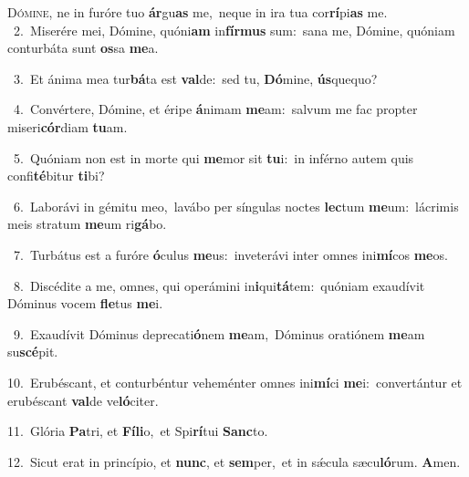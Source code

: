 \lettrine{\initial\textcolor{\initialcolor}{D}}{ómine,} ne in furóre tuo \textbf{ár}\-gu\textbf{as} me,~\star neque in ira tua cor\-\textbf{rí}\-pi\textbf{as} me.\\
{\numbfont\textcolor{\numbcolor}{~2.}}~Miserére mei, Dómine, quóni\textbf{am} in\-\textbf{fír}\-\textbf{mus} sum:~\star sana me, Dómine, quóniam conturbáta sunt \textbf{os}\-sa \textbf{me}\-a.\par
{\numbfont\textcolor{\numbcolor}{~3.}}~Et ánima mea tur\-\textbf{bá}\-ta est \textbf{val}\-de:~\star sed tu, \textbf{Dó}\-mine, \textbf{ús}\-quequo?\par
{\numbfont\textcolor{\numbcolor}{~4.}}~Convértere, Dómine, et éripe \textbf{á}\-nimam \textbf{me}\-am:~\star salvum me fac propter miseri\-\textbf{cór}\-diam \textbf{tu}\-am.\par
{\numbfont\textcolor{\numbcolor}{~5.}}~Quóniam non est in morte qui \textbf{me}\-mor sit \textbf{tu}\-i:~\star in inférno autem quis confi\-\textbf{té}\-bitur \textbf{ti}\-bi?\par
{\numbfont\textcolor{\numbcolor}{~6.}}~Laborávi in gémitu meo,~\dagger lavábo per síngulas noctes \textbf{lec}\-tum \textbf{me}\-um:~\star lácrimis meis stratum \textbf{me}\-um ri\-\textbf{gá}\-bo.\par
{\numbfont\textcolor{\numbcolor}{~7.}}~Turbátus est a furóre \textbf{ó}\-culus \textbf{me}\-us:~\star inveterávi inter omnes ini\-\textbf{mí}\-cos \textbf{me}\-os.\par
{\numbfont\textcolor{\numbcolor}{~8.}}~Discédite a me, omnes, qui operámini in\-\textbf{i}\-qui\-\textbf{tá}\-tem:~\star quóniam exaudívit Dóminus vocem \textbf{fle}\-tus \textbf{me}\-i.\par
{\numbfont\textcolor{\numbcolor}{~9.}}~Exaudívit Dóminus deprecati\-\textbf{ó}\-nem \textbf{me}\-am,~\star Dóminus oratiónem \textbf{me}\-am su\-\textbf{scé}\-pit.\par
{\numbfont\textcolor{\numbcolor}{10.}}~Erubéscant, et conturbéntur veheménter omnes ini\-\textbf{mí}\-ci \textbf{me}\-i:~\star convertántur et erubéscant \textbf{val}\-de ve\-\textbf{ló}\-citer.\par
{\numbfont\textcolor{\numbcolor}{11.}}~Glória \textbf{Pa}\-tri, et \textbf{Fí}\-\textbf{li}o,~\star et Spi\-\textbf{rí}\-tui \textbf{Sanc}\-to.\par
{\numbfont\textcolor{\numbcolor}{12.}}~Sicut erat in princípio, et \textbf{nunc}\-, et \textbf{sem}\-per,~\star et in sǽcula sæcu\-\textbf{ló}\-rum. \textbf{A}\-men.\par
